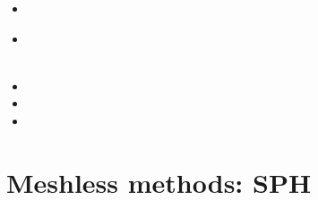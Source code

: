 \begin{scriptsize}
\begin{itemize}
\item[\nineteenninetysix]
\item[\twothousand]
\\ 
\\
\item[\twothousandone]
\item[\twothousandtwo]
\item[\twothousandfour]
\end{itemize}
\end{scriptsize}

\section{Meshless methods: SPH}

